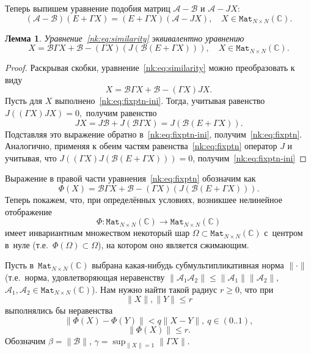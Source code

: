 \documentclass[14pt,a4paper]{extarticle}
\numberwithin{equation}{section}
\newtheorem{lem}{Лемма}
\theoremstyle{definition}
\begin{document}
Теперь выпишем уравнение подобия матриц \( \mathcal{A} - \mathcal{B} \)
и \( \mathcal{A} - J X \):
\begin{equation}\label{nk:eq:similarity}
    (\mathcal{A-B})(E+\Gamma X) = (E+\Gamma X)(\mathcal{A} - J X), \quad X\in\mathtt{Mat}_{N{\times}N}(\mathbb{C}).
\end{equation}
\begin{lem}
    Уравнение~\eqref{nk:eq:similarity} эквивалентно уравнению
    \begin{equation}\label{nk:eq:fixptn}
        X = \mathcal{B} \Gamma X + \mathcal{B} - (\Gamma X)(J(\mathcal{B} (E + \Gamma X))), \quad X\in\mathtt{Mat}_{N{\times}N}(\mathbb{C}).
    \end{equation}
\end{lem}
\begin{proof}
Раскрывая скобки, уравнение~\eqref{nk:eq:similarity} можно преобразовать к виду
\begin{equation}\label{nk:eq:fixptn-ini}
    X = \mathcal{B} \Gamma X + \mathcal{B} - (\Gamma X) J X.
\end{equation}
Пусть для \( X \) выполнено~\eqref{nk:eq:fixptn-ini}.
Тогда, учитывая равенство \( J\left((\Gamma X)JX\right) = 0, \)
получим равенство
    \begin{equation}\label{nk:eq:jx}
        J X = J\mathcal{B} + J\left(\mathcal{B}\Gamma X\right) = J(\mathcal{B} (E + \Gamma X)).
    \end{equation}
Подставляя это выражение обратно в~\eqref{nk:eq:fixptn-ini},
    получим~\eqref{nk:eq:fixptn}.
Аналогично, применяя к обеим частям равенства~\eqref{nk:eq:fixptn} оператор \( J \)
    и учитывая, что \( J\left( (\Gamma X)J(\mathcal{B} (E + \Gamma X)) \right) = 0 \),
    получим~\eqref{nk:eq:fixptn-ini}
\end{proof}

Выражение в правой части уравнения~\eqref{nk:eq:fixptn} обозначим как
\[
    \Phi(X) = \mathcal{B} \Gamma X + \mathcal{B} - (\Gamma X)(J(\mathcal{B} (E + \Gamma X))).\]
Теперь покажем, что, при определ\"енных условиях,
возникшее нелинейное отображение
\[ \Phi:\mathtt{Mat}_{N{\times}N}(\mathbb{C})\to \mathtt{Mat}_{N{\times}N}(\mathbb{C}) \]
имеет инвариантным множеством
некоторый шар \( \Omega \subset \mathtt{Mat}_{N{\times}N}(\mathbb{C}) \) с~центром в~нуле
(т.е.~\( \Phi(\Omega)\subset\Omega \)),
на котором оно является сжимающим.

Пусть в~\( \mathtt{Mat}_{N{\times}N}(\mathbb{C}) \)
выбрана какая-нибудь суб\-мульти\-пликативная норма \( \|\cdot\| \)
(т.е.~норма, удовле\-творя\-ющая неравенству
 \( \| \mathcal{A}_1\mathcal{A}_2 \| \leq \|\mathcal{A}_1\|\|\mathcal{A}_2\|, \)
 \( \mathcal{A}_1, \mathcal{A}_2 \in \mathtt{Mat}_{N{\times}N}(\mathbb{C}) \)).
Нам нужно найти такой радиус \( r \geq 0 \),
что при \[ \|X\|,\|Y\| \leq r \]
выполнялись бы неравенства
\[ \|\Phi(X) - \Phi(Y)\| < q\|X-Y\|,\ q\in(0..1), \]
\[ \|\Phi(X)\| \leq r. \]
Обозначим
\( \beta = \|\mathcal{B}\| \), \( \gamma = \sup_{\|X\|=1} \|\Gamma X\| \).
\end{document}
